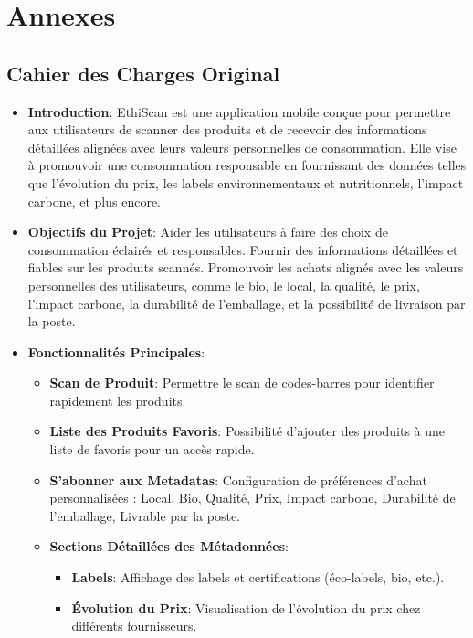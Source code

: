 \section{Annexes}

\subsection{Cahier des Charges Original}

\begin{itemize}[noitemsep]
    \item \textbf{Introduction}: EthiScan est une application mobile conçue pour permettre aux utilisateurs de scanner des produits et de recevoir des informations détaillées alignées avec leurs valeurs personnelles de consommation. Elle vise à promouvoir une consommation responsable en fournissant des données telles que l'évolution du prix, les labels environnementaux et nutritionnels, l'impact carbone, et plus encore.
    \item \textbf{Objectifs du Projet}: Aider les utilisateurs à faire des choix de consommation éclairés et responsables. Fournir des informations détaillées et fiables sur les produits scannés. Promouvoir les achats alignés avec les valeurs personnelles des utilisateurs, comme le bio, le local, la qualité, le prix, l'impact carbone, la durabilité de l'emballage, et la possibilité de livraison par la poste.
    \item \textbf{Fonctionnalités Principales}:
          \begin{itemize}[noitemsep]
              \item \textbf{Scan de Produit}: Permettre le scan de codes-barres pour identifier rapidement les produits.
              \item \textbf{Liste des Produits Favoris}: Possibilité d'ajouter des produits à une liste de favoris pour un accès rapide.
              \item \textbf{S'abonner aux Metadatas}: Configuration de préférences d'achat personnalisées : Local, Bio, Qualité, Prix, Impact carbone, Durabilité de l'emballage, Livrable par la poste.
              \item \textbf{Sections Détaillées des Métadonnées}:
                    \begin{itemize}[noitemsep]
                        \item \textbf{Labels}: Affichage des labels et certifications (éco-labels, bio, etc.).
                        \item \textbf{Évolution du Prix}: Visualisation de l'évolution du prix chez différents fournisseurs.

\end{itemize}
\end{itemize}
\end{itemize}
